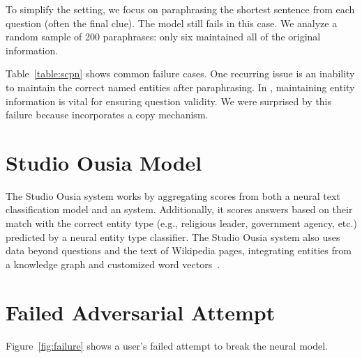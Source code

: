 To simplify the setting, we focus on paraphrasing the shortest sentence from each question (often the final clue). The model still fails in this case. We analyze a random sample of 200 paraphrases: only six maintained all of the original information. 

Table~\ref{table:scpn} shows common failure cases. One recurring issue is an inability to maintain the correct named entities after paraphrasing. In \qb{}, maintaining entity information is vital for ensuring question validity. We were surprised by this failure because  incorporates a copy mechanism.

\section{Studio Ousia \qb{} Model}
\label{sec:ousia}

The Studio Ousia system works by aggregating scores from both a neural text classification model and an  system. Additionally, it scores answers based on their match with the correct entity type (e.g., religious leader, government agency, etc.) predicted by a neural entity type classifier. The Studio Ousia system also uses data beyond \qb{} questions and the text of Wikipedia pages, integrating entities from a knowledge graph and customized word vectors~\cite{yamada2018studio}.


\section{Failed Adversarial Attempt}
\label{sec:failed}

Figure~\ref{fig:failure} shows a user's failed attempt to break the neural \qb{} model.

